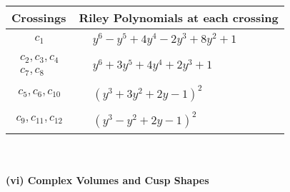 \documentclass[1p]{elsarticle_modified}
\theoremstyle{definition}
\begin{document}
\begin{tabular}{m{50pt}|m{274pt}}
Crossings & \hspace{64pt}Riley Polynomials at each crossing \\
\hline $$\begin{aligned}c_{1}\end{aligned}$$&$\begin{aligned}
&y^6- y^5+4 y^4-2 y^3+8 y^2+1
\end{aligned}$\\
\hline $$\begin{aligned}c_{2},c_{3},c_{4}\\c_{7},c_{8}\end{aligned}$$&$\begin{aligned}
&y^6+3 y^5+4 y^4+2 y^3+1
\end{aligned}$\\
\hline $$\begin{aligned}c_{5},c_{6},c_{10}\end{aligned}$$&$\begin{aligned}
&(y^3+3 y^2+2 y-1)^2
\end{aligned}$\\
\hline $$\begin{aligned}c_{9},c_{11},c_{12}\end{aligned}$$&$\begin{aligned}
&(y^3- y^2+2 y-1)^2
\end{aligned}$\\
\hline
\end{tabular}\\~\\
\newpage\flushleft \textbf{(vi) Complex Volumes and Cusp Shapes}
\end{document}
